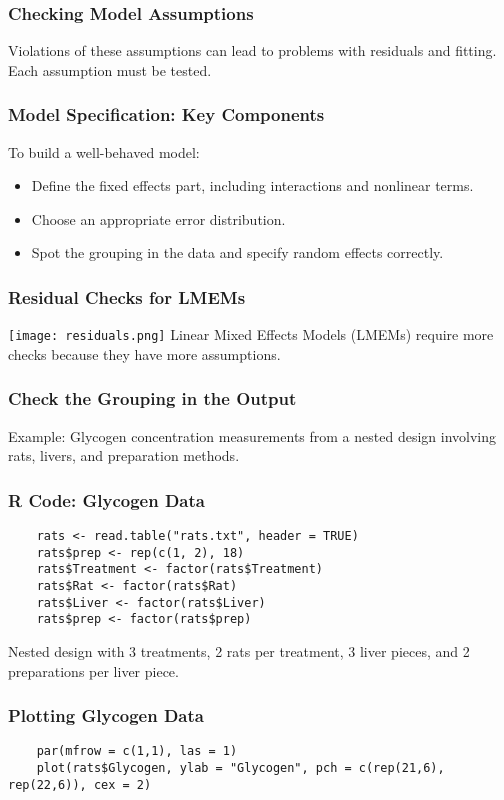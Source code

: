\documentclass{beamer}
\begin{document}
\begin{frame}
    \frametitle{Checking Model Assumptions}
    Violations of these assumptions can lead to problems with residuals and fitting. Each assumption must be tested.
\end{frame}

\begin{frame}
    \frametitle{Model Specification: Key Components}
    To build a well-behaved model:
    \begin{itemize}
        \item Define the fixed effects part, including interactions and nonlinear terms.
        \item Choose an appropriate error distribution.
        \item Spot the grouping in the data and specify random effects correctly.
    \end{itemize}
\end{frame}

\begin{frame}
    \frametitle{Residual Checks for LMEMs}
    \texttt{[image: residuals.png]}
    \newline
    Linear Mixed Effects Models (LMEMs) require more checks because they have more assumptions.
\end{frame}

\begin{frame}
    \frametitle{Check the Grouping in the Output}
    Example: Glycogen concentration measurements from a nested design involving rats, livers, and preparation methods.
\end{frame}

\begin{frame}[fragile]
    \frametitle{R Code: Glycogen Data}
    \lstset{style=Rstyle}
    \begin{lstlisting}
    rats <- read.table("rats.txt", header = TRUE)
    rats$prep <- rep(c(1, 2), 18)
    rats$Treatment <- factor(rats$Treatment)
    rats$Rat <- factor(rats$Rat)
    rats$Liver <- factor(rats$Liver)
    rats$prep <- factor(rats$prep)
    \end{lstlisting}
    Nested design with 3 treatments, 2 rats per treatment, 3 liver pieces, and 2 preparations per liver piece.
\end{frame}

\begin{frame}[fragile]
    \frametitle{Plotting Glycogen Data}
    \lstset{style=Rstyle}
    \begin{lstlisting}
    par(mfrow = c(1,1), las = 1)
    plot(rats$Glycogen, ylab = "Glycogen", pch = c(rep(21,6), rep(22,6)), cex = 2)
    \end{lstlisting}
\end{frame}
\end{document}
